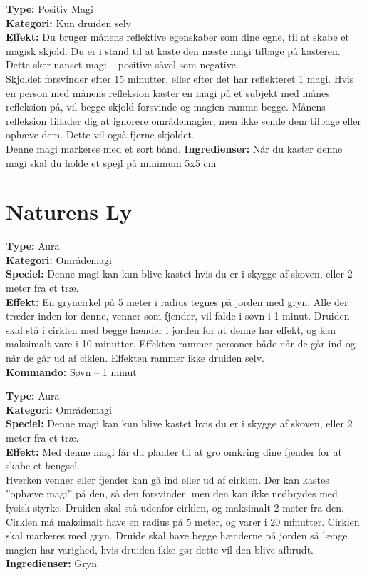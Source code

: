 \begin{nBeskyt*}
\textbf{Type:} Positiv Magi\\ 
\textbf{Kategori:} Kun druiden selv\\
\textbf{Effekt:} Du bruger månens reflektive egenskaber som dine egne, til at skabe et magisk skjold. Du er i stand til at kaste den næste magi tilbage på kasteren. Dette sker uanset magi – positive såvel som negative.\\
Skjoldet forsvinder efter 15 minutter, eller efter det har reflekteret 1 magi. Hvis en person med månens refleksion kaster en magi på et subjekt med månes refleksion på, vil begge skjold forsvinde og magien ramme begge. Månens refleksion tillader dig at ignorere områdemagier, men ikke sende dem tilbage
eller ophæve dem. Dette vil også fjerne skjoldet.\\
Denne magi markeres med et sort bånd.
\textbf{Ingredienser:} Når du kaster denne magi skal du holde et spejl på minimum 5x5 cm
\end{nBeskyt*}

\section*{Naturens Ly}

\begin{nly*}
\textbf{Type:} Aura \\
\textbf{Kategori:} Områdemagi\\
\textbf{Speciel:} Denne magi kan kun blive kastet hvis du er i skygge af skoven, eller 2 meter fra et træ.\\
\textbf{Effekt:} En gryncirkel på 5 meter i radius tegnes på jorden med gryn. Alle der træder inden for denne, venner som fjender, vil falde i søvn i 1 minut. Druiden skal stå i cirklen med begge hænder i jorden for at denne har effekt, og kan maksimalt vare i 10 minutter. Effekten rammer personer både når de går ind og når de går ud af ciklen. Effekten rammer ikke druiden selv.\\
\textbf{Kommando:} Søvn – 1 minut
\end{nly*}

\begin{nly*}
\textbf{Type:} Aura \\
\textbf{Kategori:} Områdemagi\\
\textbf{Speciel:} Denne magi kan kun blive kastet hvis du er i skygge af skoven, eller 2 meter fra et træ.\\
\textbf{Effekt:} Med denne magi får du planter til at gro omkring dine fjender for at skabe et fængsel.\\ 
Hverken venner eller fjender kan gå ind eller ud af cirklen. Der kan kastes ”ophæve magi” på den, så den forsvinder, men den kan ikke nedbrydes med fysisk styrke. Druiden skal stå udenfor cirklen, og maksimalt 2 meter fra den. Cirklen må maksimalt have en radius på 5 meter, og varer i 20 minutter. Cirklen skal
markeres med gryn. Druide skal have begge hænderne på jorden så længe magien har varighed, hvis druiden ikke gør dette vil den blive afbrudt.\\
\textbf{Ingredienser:} Gryn
\end{nly*}

